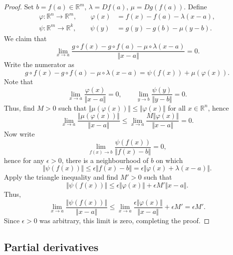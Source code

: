 \documentclass[11pt]{article}
\newcommand{\R}{\mathbb{R}}
\newcommand{\norm}[1]{\Vert #1 \Vert}
\theoremstyle{definition}
\theoremstyle{remark}
\numberwithin{equation}{section}
\begin{document}
    \begin{proof}
        Set $b = f(a) \in \R^m$, $\lambda = Df(a)$, $\mu = Dg(f(a))$. Define 
        \begin{align*}
            \varphi\colon \R^n \to \R^m,\qquad \varphi(x) &= f(x) - f(a) - \lambda(x
            - a), \\
            \psi\colon \R^m \to \R^k,\qquad \psi(y) &= g(y) - g(b) - \mu(y - b).
        \end{align*}
        We claim that \[
            \lim_{x \to a} \frac{g\circ f(x) - g\circ f(a) - \mu\circ \lambda(x
            - a)}{\norm{x - a}} = 0.
        \] Write the numerator as \[
            g\circ f(x) - g\circ f(a) - \mu\circ \lambda(x - a) = \psi(f(x)) +
            \mu(\varphi(x)).
        \] Note that \[
            \lim_{x \to a} \frac{\varphi(x)}{\norm{x - a}} = 0, \qquad 
            \lim_{y \to b} \frac{\psi(y)}{\norm{y - b}} = 0.
        \] Thus, find $M > 0$ such that $\norm{\mu(\varphi(x))} \leq
        \norm{\varphi(x)}$ for all $x \in \R^n$, hence \[
            \lim_{x \to a} \frac{\norm{\mu(\varphi(x))}}{\norm{x - a}} \leq \lim_{x
            \to a} \frac{M\norm{\varphi(x)}}{\norm{x - a}} = 0.
        \] Now write \[
            \lim_{f(x) \to b} \frac{\psi(f(x))}{\norm{f(x) - b}} = 0, 
        \] hence for any $\epsilon > 0$, there is a neighbourhood of $b$ on which \[
            \norm{\psi(f(x))} \leq \epsilon \norm{f(x) - b} = \epsilon
            \norm{\varphi(x) + \lambda(x - a)}.
        \] Apply the triangle inequality and find $M' > 0$ such that \[
            \norm{\psi(f(x))} \leq
            \epsilon\norm{\varphi(x)} + \epsilon M'\norm{x - a}.
        \] Thus, \[
            \lim_{x \to a} \frac{\norm{\psi(f(x))}}{\norm{x - a}} \leq
            \lim_{x \to a} \frac{\epsilon\norm{\varphi(x)}}{\norm{x - a}} + \epsilon
            M' = \epsilon M'.
        \] Since $\epsilon > 0$ was arbitrary, this limit is zero, completing the proof.
    \end{proof} 

    \subsection{Partial derivatives}
\end{document}
